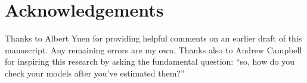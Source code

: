 \documentclass[preprint]{elsarticle}
\begin{document}
\section*{Acknowledgements}
Thanks to Albert Yuen for providing helpful comments on an earlier draft of this manuscript. Any remaining errors are my own. Thanks also to Andrew Campbell for inspiring this research by asking the fundamental question: ``so, how do you check your models after you've estimated them?''

\newpage
\section*{\refname}

\end{document}
